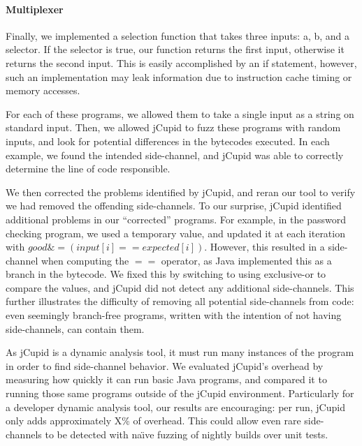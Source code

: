 \paragraph{Multiplexer}
Finally, we implemented a selection function that takes three inputs: a, b, and
a selector. If the selector is true, our function returns the first input,
otherwise it returns the second input. This is easily accomplished by an if
statement, however, such an implementation may leak information due to instruction cache timing or
memory accesses.





For each of these programs, we allowed them to take a single input as a string
on standard input. Then, we allowed jCupid to fuzz these programs with random
inputs, and look for potential differences in the bytecodes executed. In each
example, we found the intended side-channel, and jCupid was able to correctly
determine the line of code responsible.

We then corrected the problems identified by jCupid, and reran our tool to
verify we had removed the offending side-channels. To our surprise, jCupid
identified additional problems in our ``corrected'' programs. For example, in
the password checking program, we used a temporary value, and updated it at each
iteration with $ good \&= (input[i] == expected[i]) $. However, this resulted in
a side-channel when computing the $ == $ operator, as Java implemented this as a
branch in the bytecode. We fixed this by switching to using exclusive-or to
compare the values, and jCupid did not detect any additional side-channels. This
further illustrates the difficulty of removing all potential side-channels from
code: even seemingly branch-free programs, written with the intention of not
having side-channels, can contain them.


As jCupid is a dynamic analysis tool, it must run many instances of the program
in order to find side-channel behavior. We evaluated jCupid's overhead by
measuring how quickly it can run basic Java programs, and compared it to running
those same programs outside of the jCupid environment. Particularly for a
developer dynamic analysis tool, our results are encouraging: per run, jCupid
only adds approximately X\% of overhead. This could allow even rare
side-channels to be detected with na\"{\i}ve fuzzing of nightly builds over unit
tests.

